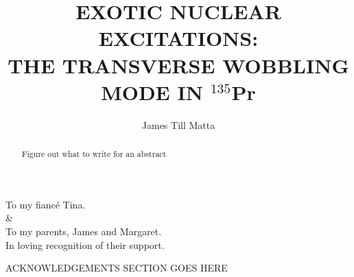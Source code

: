 \documentclass[final,numrefs,sort&compress]{nddiss2e}
\newcommand{\pr}{$^{135}$Pr}
\begin{document}
\frontmatter 
\title{EXOTIC NUCLEAR EXCITATIONS:\\
THE TRANSVERSE WOBBLING MODE IN \pr{}}
\author{James Till Matta}

\maketitle
%
%

\makecopyright

\begin{abstract}
  Figure out what to write for an abstract
\end{abstract}

\renewcommand{\dedicationname}{DEDICATED TO:}

\begin{dedication}
	To my fianc\'e Tina. \\\&\\To my parents, James and Margaret.\\
	In loving recognition of their support.
\end{dedication}

\tableofcontents
\listoffigures
\listoftables

\begin{acknowledge}
  ACKNOWLEDGEMENTS SECTION GOES HERE
\end{acknowledge}

\begin{symbols}
\end{symbols}

\mainmatter
%
%
\end{document}
